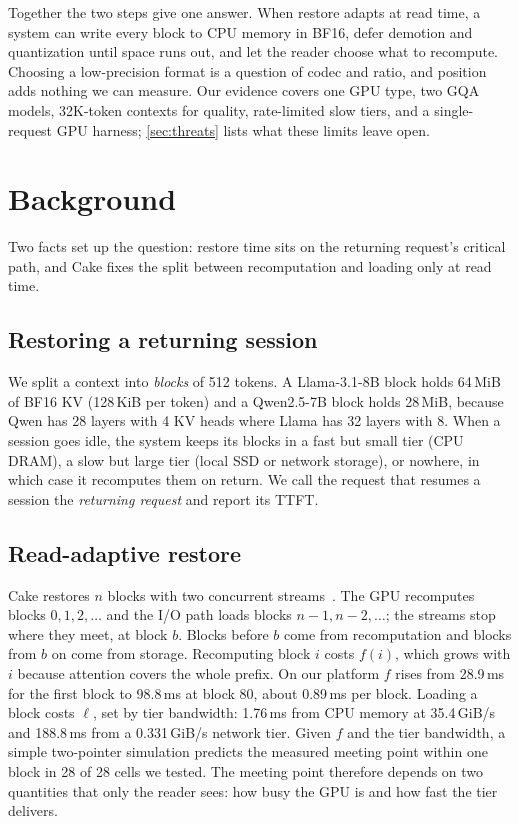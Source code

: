 \documentclass[conference]{IEEEtran}
\begin{document}
Together the two steps give one answer.
When restore adapts at read time, a system can write every block to CPU memory in BF16, defer demotion and quantization until space runs out, and let the reader choose what to recompute.
Choosing a low-precision format is a question of codec and ratio, and position adds nothing we can measure.
Our evidence covers one GPU type, two GQA models, 32K-token contexts for quality, rate-limited slow tiers, and a single-request GPU harness; \cref{sec:threats} lists what these limits leave open.

\section{Background}\label{sec:bg}
Two facts set up the question: restore time sits on the returning request's critical path, and Cake fixes the split between recomputation and loading only at read time.

\subsection{Restoring a returning session}
We split a context into \emph{blocks} of 512 tokens.
A Llama-3.1-8B block holds 64\,MiB of BF16 KV (128\,KiB per token) and a Qwen2.5-7B block holds 28\,MiB, because Qwen has 28 layers with 4 KV heads where Llama has 32 layers with 8.
When a session goes idle, the system keeps its blocks in a fast but small tier (CPU DRAM), a slow but large tier (local SSD or network storage), or nowhere, in which case it recomputes them on return.
We call the request that resumes a session the \emph{returning request} and report its TTFT.

\subsection{Read-adaptive restore}\label{sec:bg-cake}
Cake restores $n$ blocks with two concurrent streams~\cite{cake2025}.
The GPU recomputes blocks $0,1,2,\dots$ and the I/O path loads blocks $n{-}1,n{-}2,\dots$; the streams stop where they meet, at block $b$.
Blocks before $b$ come from recomputation and blocks from $b$ on come from storage.
Recomputing block $i$ costs $f(i)$, which grows with $i$ because attention covers the whole prefix.
On our platform $f$ rises from 28.9\,ms for the first block to 98.8\,ms at block 80, about 0.89\,ms per block.
Loading a block costs $\ell$, set by tier bandwidth: 1.76\,ms from CPU memory at 35.4\,GiB/s and 188.8\,ms from a 0.331\,GiB/s network tier.
Given $f$ and the tier bandwidth, a simple two-pointer simulation predicts the measured meeting point within one block in 28 of 28 cells we tested.
The meeting point therefore depends on two quantities that only the reader sees: how busy the GPU is and how fast the tier delivers.
\end{document}
